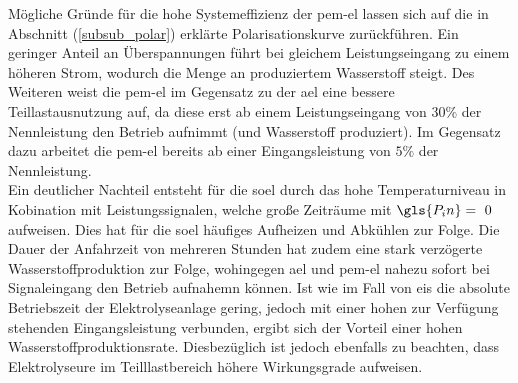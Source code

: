 \documentclass[onecolumn,10pt,titlepage]{article}
\begin{document}
Mögliche Gründe für die hohe Systemeffizienz der \gls{pem}-\gls{el} lassen sich auf die in Abschnitt (\ref{subsub_polar}) erklärte Polarisationskurve zurückführen. Ein geringer Anteil an Überspannungen führt bei gleichem Leistungseingang zu einem höheren Strom, wodurch die Menge an produziertem Wasserstoff steigt. Des Weiteren weist die \gls{pem}-\gls{el} im Gegensatz zu der \gls{ael} eine bessere Teillastausnutzung auf, da diese erst ab einem Leistungseingang von $30\%$ der Nennleistung den Betrieb aufnimmt (und Wasserstoff produziert). Im Gegensatz dazu arbeitet die \gls{pem}-\gls{el} bereits ab einer Eingangsleistung von $5\%$ der Nennleistung.\\
Ein deutlicher Nachteil entsteht für die \gls{soel} durch das hohe Temperaturniveau in Kobination mit Leistungssignalen, welche große Zeiträume mit $\gls{P_in}=~0$ aufweisen. Dies hat für die \gls{soel} häufiges Aufheizen und Abkühlen zur Folge. Die Dauer der Anfahrzeit von mehreren Stunden hat zudem eine stark verzögerte Wasserstoffproduktion zur Folge, wohingegen \gls{ael} und \gls{pem}-\gls{el} nahezu sofort bei Signaleingang den Betrieb aufnahemn können.
Ist wie im Fall von \gls{eis} die absolute Betriebszeit der Elektrolyseanlage gering, jedoch mit einer hohen zur Verfügung stehenden Eingangsleistung verbunden, ergibt sich der Vorteil einer hohen Wasserstoffproduktionsrate. Diesbezüglich ist jedoch ebenfalls zu beachten, dass Elektrolyseure im Teilllastbereich höhere Wirkungsgrade aufweisen.
%
\end{document}
